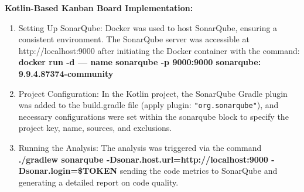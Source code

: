 \textbf{Kotlin-Based Kanban Board Implementation:}
\begin{enumerate}
    \item Setting Up SonarQube: Docker was used to host SonarQube, ensuring a consistent environment. The SonarQube server was accessible at http://localhost:9000 after initiating the Docker container with the command: \textbf{docker run -d — name sonarqube -p 9000:9000 sonarqube: 9.9.4.87374-community}
    \item Project Configuration: In the Kotlin project, the SonarQube Gradle plugin was added to the build.gradle file (apply plugin: \verb|"org.sonarqube"|), and necessary configurations were set within the sonarqube block to specify the project key, name, sources, and exclusions.
    \item Running the Analysis: The analysis was triggered via the command \textbf{./gradlew sonarqube -Dsonar.host.url=http://localhost:9000 -Dsonar.login=\$TOKEN} sending the code metrics to SonarQube and generating a detailed report on code quality.
\end{enumerate}

